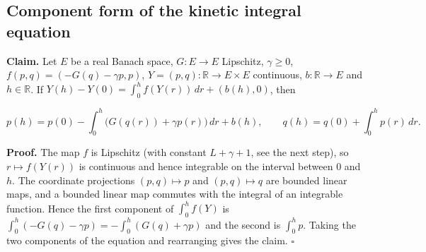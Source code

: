 \documentclass[11pt,a4paper]{report}
\begin{document}
\subsection{\texorpdfstring{Component form of the kinetic integral equation}{Component form of the kinetic integral equation}}


\textbf{Claim.} Let \(E\) be a real Banach space, \(G:E\to E\) Lipschitz, \(\gamma\ge0\), \(f(p,q)=(-G(q)-\gamma p,p)\), \(Y=(p,q):\mathbb R\to E\times E\) continuous, \(b:\mathbb R\to E\) and \(h\in\mathbb R\). If \(Y(h)-Y(0)=\int_0^hf(Y(r))\,dr+(b(h),0)\), then


\[p(h)=p(0)-\int_0^h\bigl(G(q(r))+\gamma p(r)\bigr)\,dr+b(h),\qquad q(h)=q(0)+\int_0^hp(r)\,dr .\]


\textbf{Proof.} The map \(f\) is Lipschitz (with constant \(L+\gamma+1\), see the next step), so \(r\mapsto f(Y(r))\) is continuous and hence integrable on the interval between \(0\) and \(h\). The coordinate projections \((p,q)\mapsto p\) and \((p,q)\mapsto q\) are bounded linear maps, and a bounded linear map commutes with the integral of an integrable function. Hence the first component of \(\int_0^hf(Y)\) is \(\int_0^h(-G(q)-\gamma p)=-\int_0^h(G(q)+\gamma p)\) and the second is \(\int_0^hp\). Taking the two components of the equation and rearranging gives the claim. \(\square\)
\end{document}
